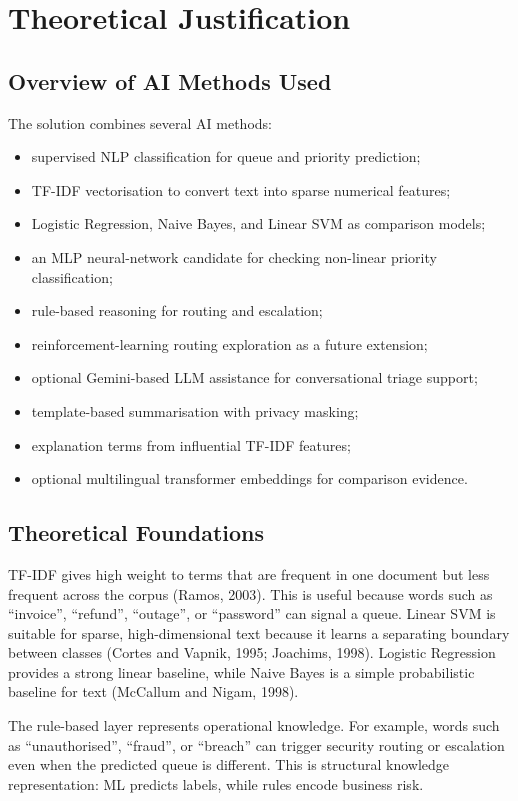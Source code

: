 \documentclass[11pt,a4paper]{article}
\begin{document}
\section{Theoretical Justification}
\subsection{Overview of AI Methods Used}
The solution combines several AI methods:
\begin{itemize}
  \item supervised NLP classification for queue and priority prediction;
  \item TF-IDF vectorisation to convert text into sparse numerical features;
  \item Logistic Regression, Naive Bayes, and Linear SVM as comparison models;
  \item an MLP neural-network candidate for checking non-linear priority classification;
  \item rule-based reasoning for routing and escalation;
  \item reinforcement-learning routing exploration as a future extension;
  \item optional Gemini-based LLM assistance for conversational triage support;
  \item template-based summarisation with privacy masking;
  \item explanation terms from influential TF-IDF features;
  \item optional multilingual transformer embeddings for comparison evidence.
\end{itemize}

\subsection{Theoretical Foundations}
TF-IDF gives high weight to terms that are frequent in one document but less frequent across the corpus (Ramos, 2003). This is useful because words such as ``invoice'', ``refund'', ``outage'', or ``password'' can signal a queue. Linear SVM is suitable for sparse, high-dimensional text because it learns a separating boundary between classes (Cortes and Vapnik, 1995; Joachims, 1998). Logistic Regression provides a strong linear baseline, while Naive Bayes is a simple probabilistic baseline for text (McCallum and Nigam, 1998).

The rule-based layer represents operational knowledge. For example, words such as ``unauthorised'', ``fraud'', or ``breach'' can trigger security routing or escalation even when the predicted queue is different. This is structural knowledge representation: ML predicts labels, while rules encode business risk.
\end{document}
